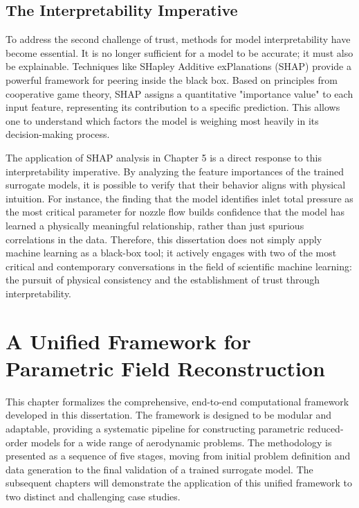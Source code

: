 \documentclass[dsc, EN]{ufabcFHZh}
\begin{document}
{\section{The Interpretability Imperative}

To address the second challenge of trust, methods for model interpretability have become essential. It is no longer sufficient for a model to be accurate; it must also be explainable. Techniques like SHapley Additive exPlanations (SHAP) provide a powerful framework for peering inside the black box. Based on principles from cooperative game theory, SHAP assigns a quantitative "importance value" to each input feature, representing its contribution to a specific prediction. This allows one to understand which factors the model is weighing most heavily in its decision-making process. 

The application of SHAP analysis in Chapter 5 is a direct response to this interpretability imperative. By analyzing the feature importances of the trained surrogate models, it is possible to verify that their behavior aligns with physical intuition. For instance, the finding that the model identifies inlet total pressure as the most critical parameter for nozzle flow builds confidence that the model has learned a physically meaningful relationship, rather than just spurious correlations in the data. Therefore, this dissertation does not simply apply machine learning as a black-box tool; it actively engages with two of the most critical and contemporary conversations in the field of scientific machine learning: the pursuit of physical consistency and the establishment of trust through interpretability. 


\chapter{A Unified Framework for Parametric Field Reconstruction}

This chapter formalizes the comprehensive, end-to-end computational framework developed in this dissertation. The framework is designed to be modular and adaptable, providing a systematic pipeline for constructing parametric reduced-order models for a wide range of aerodynamic problems. The methodology is presented as a sequence of five stages, moving from initial problem definition and data generation to the final validation of a trained surrogate model. The subsequent chapters will demonstrate the application of this unified framework to two distinct and challenging case studies.

}
\end{document}
